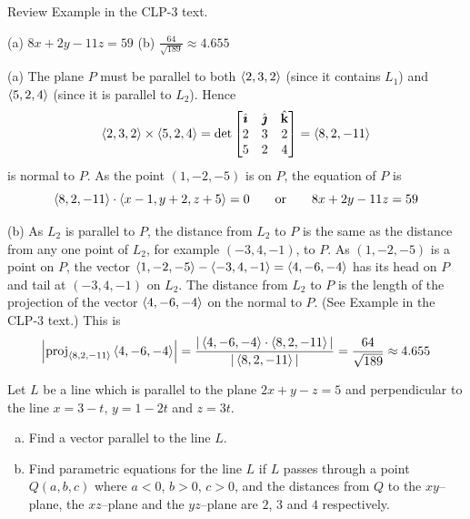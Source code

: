 \begin{hint}
Review Example  in the CLP-3 text.
\end{hint}

\begin{answer}
(a) $8x+2y-11z=59$\qquad
(b) $\frac{64}{\sqrt{189}} \approx 4.655$
\end{answer}

\begin{solution}
(a) The plane $P$ must be parallel to both $\left< 2,3,2\right> $ (since it 
contains $L_1$) and $\left< 5,2,4\right> $ (since it is parallel to $L_2$).
Hence 
\begin{equation*}
\left< 2,3,2\right> \times \left< 5,2,4\right> 
=\det\left[\begin{matrix}
           \hat{\pmb{\imath}} & \hat{\pmb{\jmath}} & \hat{\mathbf{k}} \\
           2  &  3  & 2 \\
           5  &  2  & 4
  \end{matrix}\right]
=\left< 8,2,-11\right> 
\end{equation*}
is normal to $P$. As the point $(1,-2,-5)$ is on $P$, the equation
of $P$ is
\begin{equation*}
\left< 8,2,-11\right> \cdot\left< x-1,y+2,z+5\right> =0\qquad \text{or}\qquad 8x+2y-11z=59
\end{equation*}

(b) As $L_2$ is parallel to $P$, the distance from $L_2$ to $P$ is the
same as the distance from any one point of $L_2$, for example $(-3,4,-1)$,
to $P$. As $(1,-2,-5)$ is a point on $P$, the vector 
$\left< 1,-2,-5\right>-\left< -3, 4,-1\right> =\left< 4,-6,-4\right> $ has its head on $P$ 
and tail at $(-3,4,-1)$ on $L_2$. 
The distance from $L_2$ to $P$ is the length of the projection of the vector $\left< 4,-6,-4\right> $ on the normal to $P$. (See Example  in the CLP-3 text.) This is 
\begin{equation*}
\left|\text{proj}_{\left< 8,2,-11\right>}\left< 4,-6,-4\right>\right|
=\frac{|\left< 4,-6,-4\right> \cdot\left< 8,2,-11\right>|} {|\left< 8,2,-11\right>|}
=\frac{64}{\sqrt{189}}
\approx4.655
\end{equation*}
\end{solution}


\begin{question}[M200 2012a] %
Let $L$ be a line which is parallel to the plane $2x + y  - z = 5$ and 
perpendicular to the line $x = 3 - t$, $y = 1 - 2t$ and $z = 3t$.
\begin{enumerate}[(a)]
\item
Find a vector parallel to the line $L$.
\item
Find parametric equations for the line $L$ if $L$ passes through a point 
$Q(a, b, c)$
where $a < 0$, $b > 0$, $c > 0$, and the distances from $Q$ to the $xy$--plane, 
the $xz$--plane and the $yz$--plane are $2$, $3$ and $4$ respectively.
\end{enumerate}
\end{question}

